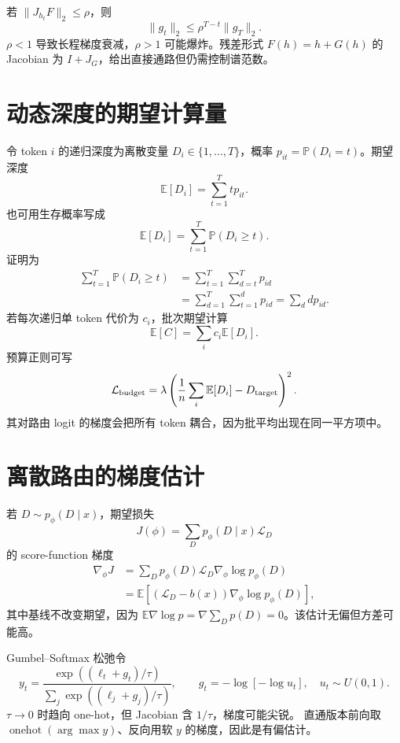 \documentclass[11pt]{article}
\numberwithin{equation}{section}
\newcommand{\E}{\mathbb{E}}
\newcommand{\Pp}{\mathbb{P}}
\newcommand{\1}{\mathbf{1}}
\newcommand{\cL}{\mathcal{L}}
\begin{document}
若 $\|J_{h_t}F\|_2\le\rho$，则
\begin{equation}
 \|g_t\|_2\le\rho^{T-t}\|g_T\|_2.
\end{equation}
$\rho<1$ 导致长程梯度衰减，$\rho>1$ 可能爆炸。残差形式
$F(h)=h+G(h)$ 的 Jacobian 为 $I+J_G$，给出直接通路但仍需控制谱范数。

\section{动态深度的期望计算量}

令 token $i$ 的递归深度为离散变量
$D_i\in\{1,\ldots,T\}$，概率 $p_{it}=\Pp(D_i=t)$。期望深度
\begin{equation}
 \E[D_i]=\sum_{t=1}^{T}tp_{it}.
\end{equation}
也可用生存概率写成
\begin{equation}
 \E[D_i]=\sum_{t=1}^{T}\Pp(D_i\ge t).
\end{equation}
证明为
\begin{align}
 \sum_{t=1}^{T}\Pp(D_i\ge t)
 &=\sum_{t=1}^{T}\sum_{d=t}^{T}p_{id}\\
 &=\sum_{d=1}^{T}\sum_{t=1}^{d}p_{id}
 =\sum_ddp_{id}.
\end{align}
若每次递归单 token 代价为 $c_i$，批次期望计算
\begin{equation}
 \E[C]=\sum_i c_i\E[D_i].
\end{equation}
预算正则可写
\begin{equation}
 \cL_{\rm budget}=\lambda
 \left(\frac1n\sum_i\E[D_i]-D_{\rm target}\right)^2.
\end{equation}
其对路由 logit 的梯度会把所有 token 耦合，因为批平均出现在同一平方项中。

\section{离散路由的梯度估计}

若 $D\sim p_\phi(D\mid x)$，期望损失
\begin{equation}
 J(\phi)=\sum_Dp_\phi(D\mid x)\cL_D
\end{equation}
的 score-function 梯度
\begin{align}
 \nabla_\phi J
 &=\sum_Dp_\phi(D)\cL_D\nabla_\phi\log p_\phi(D)\\
 &=\E[(\cL_D-b(x))\nabla_\phi\log p_\phi(D)],
\end{align}
其中基线不改变期望，因为
$\E\nabla\log p=\nabla\sum_Dp(D)=0$。该估计无偏但方差可能高。

Gumbel--Softmax 松弛令
\begin{equation}
 y_t=\frac{\exp((\ell_t+g_t)/\tau)}
 {\sum_j\exp((\ell_j+g_j)/\tau)},\qquad
 g_t=-\log[-\log u_t],\quad u_t\sim U(0,1).
\end{equation}
$\tau\to0$ 时趋向 one-hot，但 Jacobian 含 $1/\tau$，梯度可能尖锐。
直通版本前向取 $\operatorname{onehot}(\arg\max y)$、反向用软 $y$ 的梯度，因此是有偏估计。
\end{document}
